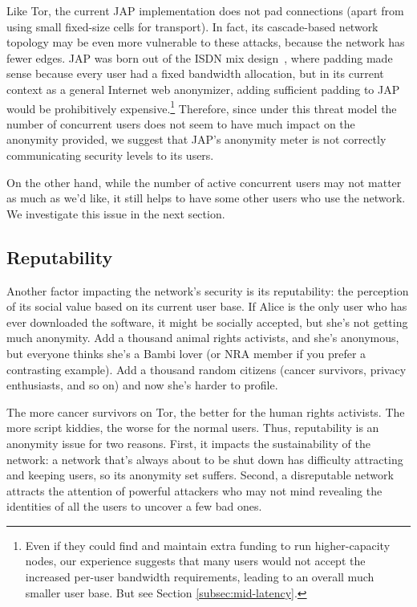 \documentclass{llncs}
\begin{document}
Like Tor, the current JAP implementation does not pad connections
(apart from using small fixed-size cells for transport). In fact,
its cascade-based network topology may be even more vulnerable to these
attacks, because the network has fewer edges. JAP was born out of
the ISDN mix design~\cite{isdn-mixes}, where padding made sense because
every user had a fixed bandwidth allocation, but in its current context
as a general Internet web anonymizer, adding sufficient padding to JAP
would be prohibitively expensive.\footnote{Even if they could find and
maintain extra funding to run higher-capacity nodes, our experience
suggests that many users would not accept the increased per-user
bandwidth requirements, leading to an overall much smaller user base. But
see Section \ref{subsec:mid-latency}.} Therefore, since under this threat
model the number of concurrent users does not seem to have much impact
on the anonymity provided, we suggest that JAP's anonymity meter is not
correctly communicating security levels to its users.


On the other hand, while the number of active concurrent users may not
matter as much as we'd like, it still helps to have some other users
who use the network. We investigate this issue in the next section.

\subsection{Reputability}

Another factor impacting the network's security is its reputability:
the perception of its social value based on its current user base. If Alice is
the only user who has ever downloaded the software, it might be socially
accepted, but she's not getting much anonymity. Add a thousand animal rights
activists, and she's anonymous, but everyone thinks she's a Bambi lover (or
NRA member if you prefer a contrasting example). Add a thousand
random citizens (cancer survivors, privacy enthusiasts, and so on)
and now she's harder to profile.

The more cancer survivors on Tor, the better for the human rights
activists. The more script kiddies, the worse for the normal users. Thus,
reputability is an anonymity issue for two reasons. First, it impacts
the sustainability of the network: a network that's always about to be
shut down has difficulty attracting and keeping users, so its anonymity
set suffers.
Second, a disreputable network attracts the attention of
powerful attackers who may not mind revealing the identities of all the
users to uncover a few bad ones.
\end{document}
